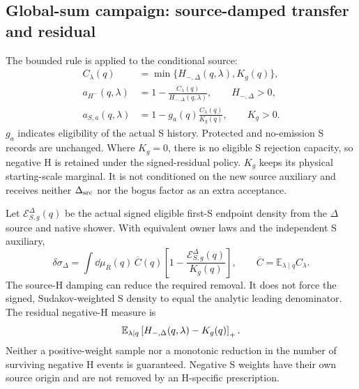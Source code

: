 \subsection{Global-sum campaign: source-damped transfer and residual}
\label{sec:delta-balance}

The bounded rule is applied to the conditional source:
\begin{align}
 C_\lambda(q)&=\min\{H_{-,\Delta}(q,\lambda),K_g(q)\},
 \label{eq:delta-cancellation}\\
 a_{H^-}(q,\lambda)&=
       1-\frac{C_\lambda(q)}{H_{-,\Delta}(q,\lambda)},
       \qquad H_{-,\Delta}>0,
 \label{eq:delta-h-accept}\\
 a_{S,a}(q,\lambda)&=
       1-g_a(q)\frac{C_\lambda(q)}{K_g(q)},
       \qquad K_g>0 .
 \label{eq:delta-s-accept}
\end{align}
$g_a$ indicates eligibility of the actual S history.
Protected and no-emission S records are unchanged.
Where $K_g=0$, there is no eligible S rejection capacity,
so negative H is retained under the signed-residual policy.
$K_g$ keeps its physical starting-scale marginal.
It is not conditioned on the new source auxiliary and receives
neither $\Delta_{\rm src}$ nor the bogus factor as an extra acceptance.

Let $\mathcal E_{S,g}^{\Delta}(q)$ be the actual signed eligible
first-S endpoint density from the $\Delta$ source and native shower.
With equivalent owner laws and the independent S auxiliary,
\begin{equation}
 \delta\sigma_\Delta=
   \int\dd\mu_R(q)\,
      \overline C(q)
      \left[1-\frac{\mathcal E_{S,g}^{\Delta}(q)}{K_g(q)}\right],
 \qquad
 \overline C=\mathbb E_{\lambda\mid q}C_\lambda .
 \label{eq:delta-rate-defect}
\end{equation}
The source-H damping can reduce the required removal.
It does not force the signed, Sudakov-weighted S density to equal
the analytic leading denominator.
The residual negative-H measure is
\begin{equation}
 \mathbb E_{\lambda\mid q}
       \left[H_{-,\Delta}(q,\lambda)-K_g(q)\right]_+ .
 \label{eq:delta-residual}
\end{equation}
Neither a positive-weight sample nor a monotonic reduction in the
number of surviving negative H events is guaranteed.
Negative S weights have their own source origin and are not removed
by an H-specific prescription.

